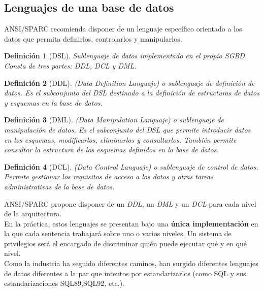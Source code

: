 \documentclass[12pt,spanish]{article}
\newtheorem{definition}{Definición}
\numberwithin{definition}{subsection}
\begin{document}
\subsection{Lenguajes de una base de datos}

ANSI/SPARC recomienda disponer de un lenguaje específico orientado a los datos que permita definirlos, controlarlos y manipularlos.\\

\begin{definition}[DSL]
Sublenguaje de datos implementado en el propio SGBD. Consta de tres partes: DDL, DCL y DML.
\end{definition}


\begin{definition}[DDL]
\textit{(Data Definition Languaje)} o sublenguaje de definición de datos. Es el subconjunto del DSL destinado a la definición de estructuras de datos y esquemas en la base de datos.
\end{definition}

\begin{definition}[DML]
\textit{(Data Manipulation Languaje)} o sublenguaje de manipulación de datos. Es el subconjunto del DSL que permite introducir datos en los esquemas, modificarlos, eliminarlos y consultarlos. También permite consultar la estructura de los esquemas definidos en la base de datos.
\end{definition}

\begin{definition}[DCL]
\textit{(Data Control Languaje)} o sublenguaje de control de datos. Permite gestionar los requisitos de acceso a los datos y otras tareas administrativas de la base de datos.
\end{definition}

ANSI/SPARC propone disponer de un \emph{DDL}, un \emph{DML} y un \emph{DCL} para cada nivel de la arquitectura.\\

En la práctica, estos lenguajes se presentan bajo una \textbf{única implementación} en la que cada sentencia trabajará sobre uno o varios niveles. Un sistema de privilegios será el encargado de discriminar quién puede ejecutar qué y en qué nivel.\\

Como la industria ha seguido diferentes caminos, han surgido diferentes lenguajes de datos diferentes a la par que intentos por estandarizarlos (como SQL y sus estandarizaciones SQL89,SQL92, etc.).\\
\end{document}
